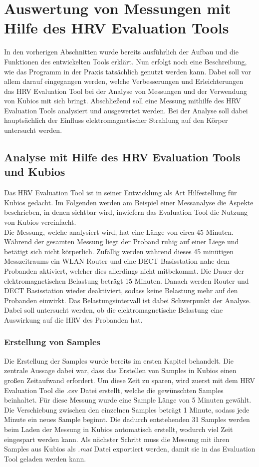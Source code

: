 
\chapter{Auswertung von Messungen mit Hilfe des HRV Evaluation Tools}
In den vorherigen Abschnitten wurde bereits ausführlich der Aufbau und die Funktionen des entwickelten Tools erklärt. Nun erfolgt noch eine Beschreibung, wie das Programm in der Praxis tatsächlich genutzt werden kann. Dabei soll vor allem darauf eingegangen werden, welche Verbesserungen und Erleichterungen das HRV Evaluation Tool bei der Analyse von Messungen und der Verwendung von Kubios mit sich bringt. Abschließend soll eine Messung mithilfe des HRV Evaluation Tools analysiert und ausgewertet werden. Bei der Analyse soll dabei hauptsächlich der Einfluss elektromagnetischer Strahlung auf den Körper untersucht werden. 

\section{Analyse mit Hilfe des  HRV Evaluation Tools und Kubios}
Das HRV Evaluation Tool ist in seiner Entwicklung als Art Hilfestellung für Kubios gedacht. Im Folgenden werden am Beispiel einer Messanalyse die Aspekte beschrieben, in denen sichtbar wird, inwiefern das Evaluation Tool die Nutzung von Kubios vereinfacht.\\

Die Messung, welche analysiert wird, hat eine Länge von circa 45 Minuten. Während der gesamten Messung liegt der Proband ruhig auf einer Liege und betätigt sich nicht körperlich. Zufällig werden während dieses 45 minütigen Messzeitraums ein WLAN Router und eine DECT Basisstation nahe dem Probanden aktiviert, welcher dies allerdings nicht mitbekommt. Die Dauer der elektromagnetischen Belastung beträgt 15 Minuten. Danach werden Router und DECT Basisstation wieder deaktiviert, sodass keine Belastung mehr auf den Probanden einwirkt. Das Belastungsintervall ist dabei Schwerpunkt der Analyse. Dabei soll untersucht werden, ob die elektromagnetische Belastung eine Auswirkung auf die HRV des Probanden hat.

\subsection{Erstellung von Samples}
Die Erstellung der Samples wurde bereits im ersten Kapitel behandelt. Die zentrale Aussage dabei war, dass das Erstellen von Samples in Kubios einen großen Zeitaufwand erfordert. Um diese Zeit zu sparen, wird zuerst mit dem HRV Evaluation Tool  die .csv Datei erstellt, welche die gewünschten Samples beinhaltet.
Für diese Messung wurde eine Sample Länge von 5 Minuten gewählt. Die Verschiebung zwischen den einzelnen Samples beträgt 1 Minute, sodass jede Minute ein neues Sample beginnt. Die dadurch entstehenden 31 Samples werden beim Laden der Messung in Kubios automatisch erstellt, wodurch viel Zeit eingespart werden kann. Als nächster Schritt muss die Messung mit ihren Samples aus Kubios als \textit{.mat} Datei exportiert werden, damit sie in das Evaluation Tool geladen werden kann. 

